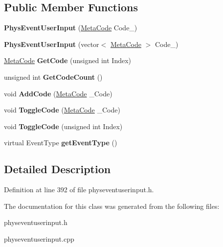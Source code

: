\subsection*{Public Member Functions}
\begin{DoxyCompactItemize}
\item 
\hypertarget{classPhysEventUserInput_a218bec21fe49efcba82f3480e2386968}{
{\bfseries PhysEventUserInput} (\hyperlink{classMetaCode}{MetaCode} Code\_\-)}
\label{dc/d0e/classPhysEventUserInput_a218bec21fe49efcba82f3480e2386968}

\item 
\hypertarget{classPhysEventUserInput_ab9451ee5b385a3c575922ec7cfa07747}{
{\bfseries PhysEventUserInput} (vector$<$ \hyperlink{classMetaCode}{MetaCode} $>$ Code\_\-)}
\label{dc/d0e/classPhysEventUserInput_ab9451ee5b385a3c575922ec7cfa07747}

\item 
\hypertarget{classPhysEventUserInput_a590b347fcd5db7a48fc460b1ed538e4f}{
\hyperlink{classMetaCode}{MetaCode} {\bfseries GetCode} (unsigned int Index)}
\label{dc/d0e/classPhysEventUserInput_a590b347fcd5db7a48fc460b1ed538e4f}

\item 
\hypertarget{classPhysEventUserInput_a8232572283b9dc85c96a2b28479123a8}{
unsigned int {\bfseries GetCodeCount} ()}
\label{dc/d0e/classPhysEventUserInput_a8232572283b9dc85c96a2b28479123a8}

\item 
\hypertarget{classPhysEventUserInput_a2b30cdf2aedb70940b85bb9e4665230f}{
void {\bfseries AddCode} (\hyperlink{classMetaCode}{MetaCode} \_\-Code)}
\label{dc/d0e/classPhysEventUserInput_a2b30cdf2aedb70940b85bb9e4665230f}

\item 
\hypertarget{classPhysEventUserInput_a4d95c43110ac7023c5da208c14db565f}{
void {\bfseries ToggleCode} (\hyperlink{classMetaCode}{MetaCode} \_\-Code)}
\label{dc/d0e/classPhysEventUserInput_a4d95c43110ac7023c5da208c14db565f}

\item 
\hypertarget{classPhysEventUserInput_a1bf30bbab980fd0beee52509bdb4a2ad}{
void {\bfseries ToggleCode} (unsigned int Index)}
\label{dc/d0e/classPhysEventUserInput_a1bf30bbab980fd0beee52509bdb4a2ad}

\item 
\hypertarget{classPhysEventUserInput_a7adabb15e8012a86c9da1910033eea4b}{
virtual EventType {\bfseries getEventType} ()}
\label{dc/d0e/classPhysEventUserInput_a7adabb15e8012a86c9da1910033eea4b}

\end{DoxyCompactItemize}


\subsection{Detailed Description}


Definition at line 392 of file physeventuserinput.h.

The documentation for this class was generated from the following files:\begin{DoxyCompactItemize}
\item 
physeventuserinput.h\item 
physeventuserinput.cpp\end{DoxyCompactItemize}
